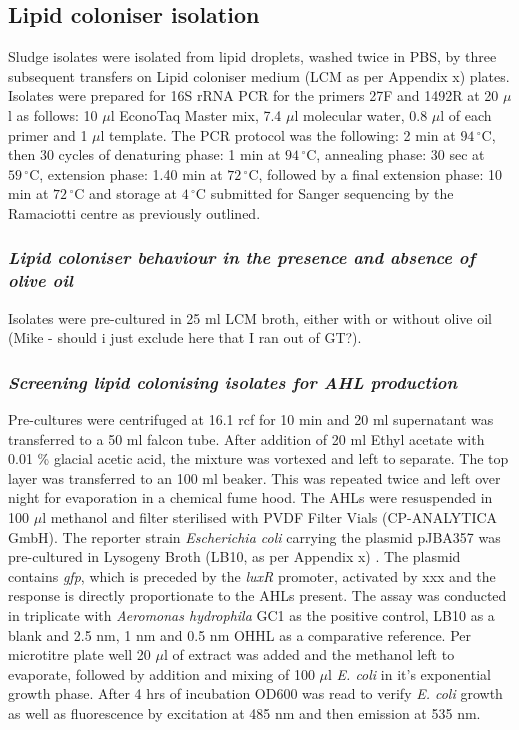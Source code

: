 \documentclass{article}
\begin{document}
\subsection{Lipid coloniser isolation}
Sludge isolates  were isolated from lipid droplets, washed twice in PBS, by three subsequent transfers on Lipid coloniser medium (LCM as per Appendix x) plates. Isolates were prepared for 16S rRNA PCR for the primers 27F and 1492R at 20 $\mu$l as follows: 10 $\mu$l EconoTaq Master mix, 7.4 $\mu$l molecular water, 0.8 $\mu$l of each primer and 1 $\mu$l template. The PCR protocol was the following: 2 min at $94\,^{\circ}\mathrm{C}$, then 30 cycles of denaturing phase: 1 min at $94\,^{\circ}\mathrm{C}$, annealing phase: 30 sec at  $59\,^{\circ}\mathrm{C}$, extension phase: 1.40 min at $72\,^{\circ}\mathrm{C}$, followed by a final extension phase: 10 min at $72\,^{\circ}\mathrm{C}$ and storage at $4\,^{\circ}\mathrm{C}$ submitted for Sanger sequencing by the Ramaciotti centre as previously outlined.

\subsubsection{\emph{Lipid coloniser behaviour in the presence and absence of olive oil}}
Isolates were pre-cultured in 25 ml LCM broth, either with or without olive oil (Mike - should i just exclude here that I ran out of GT?). 

\subsubsection{\emph{Screening lipid colonising isolates for AHL production}}
Pre-cultures were centrifuged at 16.1 rcf for 10 min and 20 ml supernatant was transferred to a 50 ml falcon tube. After addition of 20 ml Ethyl acetate with 0.01 \% glacial acetic acid, the mixture was vortexed and left to separate. The top  layer was transferred to an 100 ml beaker. This was repeated twice and left over night for evaporation in a chemical fume hood. The AHLs were resuspended in 100  $\mu$l methanol and filter sterilised with PVDF Filter Vials (CP-ANALYTICA GmbH). 
 The reporter strain \emph{Escherichia coli} carrying the plasmid pJBA357 was pre-cultured in Lysogeny Broth (LB10, as per Appendix x) \cite{bertani1951studies}. The plasmid contains \emph{gfp}, which  is preceded by the \emph{luxR} promoter, activated by xxx and the response is directly proportionate to the AHLs present.
The assay was conducted in triplicate with \emph{Aeromonas hydrophila} GC1 as the positive control, LB10 as a blank and 2.5 nm, 1 nm and 0.5 nm OHHL as a comparative reference. Per microtitre plate well 20 $\mu$l of extract was added and the methanol left to evaporate, followed by addition and mixing of 100 $\mu$l \emph{E. coli} in it's exponential growth phase. After 4 hrs of incubation OD600 was read to verify \emph{E. coli} growth as well as fluorescence by excitation at 485 nm and then emission at 535 nm.
\end{document}
